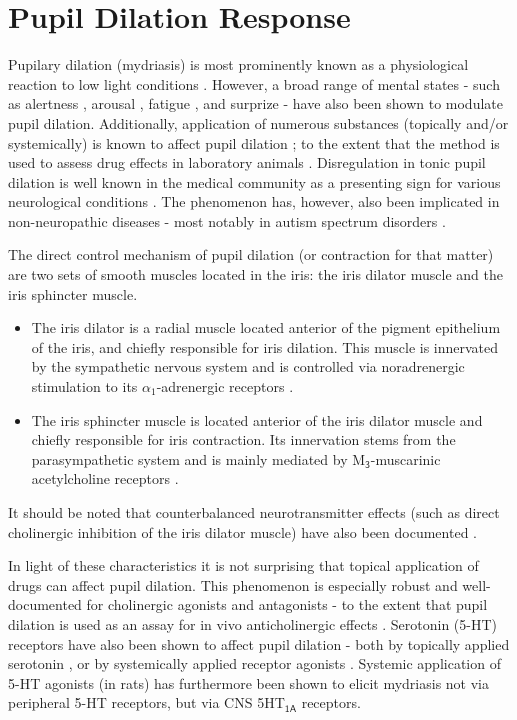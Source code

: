     \section{Pupil Dilation Response}
	Pupilary dilation (mydriasis) is most prominently known as a physiological reaction to low light conditions \citep{Ellis1981}. 
	However, a broad range of mental states - 
	such as alertness \citep{Yoss1970}, arousal \citep{Bradshaw1967}, fatigue \citep{Morad2000}, and surprize \citep{Preuschoff2011} -
	have also been shown to modulate pupil dilation.
	Additionally, application of numerous substances (topically and/or systemically) is known to affect pupil dilation \citep{Theofilopoulos1988, Bye1979, Phillips2000}; to the extent that the method is used to assess drug effects in laboratory animals \citep{Murray1981}.
	Disregulation in tonic pupil dilation is well known in the medical community as a presenting sign for various neurological conditions \citep{Caglayan2013}.
	The phenomenon has, however, also been implicated in non-neuropathic diseases - most notably in autism spectrum disorders \citep{Anderson2013}.
	
	The direct control mechanism of pupil dilation (or contraction for that matter) are two sets of smooth muscles located in the iris: the iris dilator muscle and the iris sphincter muscle.
	\begin{itemize}
	    \item The iris dilator is a radial muscle located anterior of the pigment epithelium of the iris, and chiefly responsible for iris dilation.
	    This muscle is innervated by the sympathetic nervous system and is controlled via noradrenergic stimulation to its $\alpha_1$-adrenergic receptors \citep{vanAlphen1976}.
	    \item The iris sphincter muscle is located anterior of the iris dilator muscle and chiefly responsible for iris contraction.
	    Its innervation stems from the parasympathetic system and is mainly mediated by M$\mathsf{_3}$-muscarinic acetylcholine receptors \citep{Woldemussie1993,Taylor1974}.
	\end{itemize}
	It should be noted that counterbalanced neurotransmitter effects (such as direct cholinergic inhibition of the iris dilator muscle) have also been documented \citep{Yoshitomi1985}.
	
	In light of these characteristics it is not surprising that topical application of drugs can affect pupil dilation.
	This phenomenon is especially robust and well-documented for cholinergic agonists \citep{Smith1978} and antagonists \citep{Gambill1967} -
	to the extent that pupil dilation is used as an assay for in vivo anticholinergic effects \citep{Bye1979}.
	Serotonin (5-HT) receptors have also been shown to affect pupil dilation - both by topically applied serotonin \citep{KOELLA1962}, or by systemically applied receptor agonists \citep{Yu2004}.
	Systemic application of 5-HT agonists (in rats) has furthermore been shown to elicit mydriasis not via peripheral 5-HT receptors, but via CNS 5HT$\mathsf{_{1A}}$ receptors.
	
